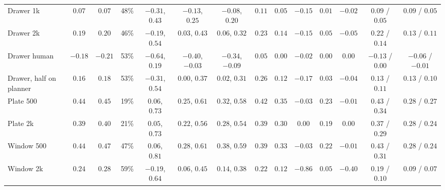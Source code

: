 \begin{table}[t]
{\begin{tabular}{lccccccccccccc}
Drawer 1k & $0.07$ & $0.07$ & 48\% & $-0.31$, $0.43$ & $-0.13$, $0.25$ & $-0.08$, $0.20$ & $0.11$ & $0.05$ & $-0.15$ & $0.01$ & $-0.02$ & $0.09$ / $0.05$ & $0.09$ / $0.05$ \\
Drawer 2k & $0.19$ & $0.20$ & 46\% & $-0.19$, $0.54$ & $0.03$, $0.43$ & $0.06$, $0.32$ & $0.23$ & $0.14$ & $-0.15$ & $0.05$ & $-0.05$ & $0.22$ / $0.14$ & $0.13$ / $0.11$ \\
Drawer human & $-0.18$ & $-0.21$ & 53\% & $-0.64$, $0.19$ & $-0.40$, $-0.03$ & $-0.34$, $-0.09$ & $0.05$ & $0.00$ & $-0.02$ & $0.00$ & $0.00$ & $-0.13$ / $0.00$ & $-0.06$ / $-0.01$ \\
Drawer, half on planner & $0.16$ & $0.18$ & 53\% & $-0.31$, $0.54$ & $0.00$, $0.37$ & $0.02$, $0.31$ & $0.26$ & $0.12$ & $-0.17$ & $0.03$ & $-0.04$ & $0.13$ / $0.11$ & $0.13$ / $0.10$ \\
Plate 500 & $0.44$ & $0.45$ & 19\% & $0.06$, $0.73$ & $0.25$, $0.61$ & $0.32$, $0.58$ & $0.42$ & $0.35$ & $-0.03$ & $0.23$ & $-0.01$ & $0.43$ / $0.34$ & $0.28$ / $0.27$ \\
Plate 2k & $0.39$ & $0.40$ & 21\% & $0.05$, $0.73$ & $0.22$, $0.56$ & $0.28$, $0.54$ & $0.39$ & $0.30$ & $0.00$ & $0.19$ & $0.00$ & $0.37$ / $0.29$ & $0.28$ / $0.24$ \\
Window 500 & $0.44$ & $0.47$ & 47\% & $0.06$, $0.81$ & $0.28$, $0.61$ & $0.38$, $0.59$ & $0.39$ & $0.33$ & $-0.03$ & $0.22$ & $-0.01$ & $0.43$ / $0.31$ & $0.28$ / $0.24$ \\
Window 2k & $0.24$ & $0.28$ & 59\% & $-0.19$, $0.64$ & $0.06$, $0.45$ & $0.14$, $0.38$ & $0.22$ & $0.12$ & $-0.86$ & $0.05$ & $-0.40$ & $0.19$ / $0.10$ & $0.09$ / $0.07$ \\
\bottomrule
\end{tabular}}
\end{table}
